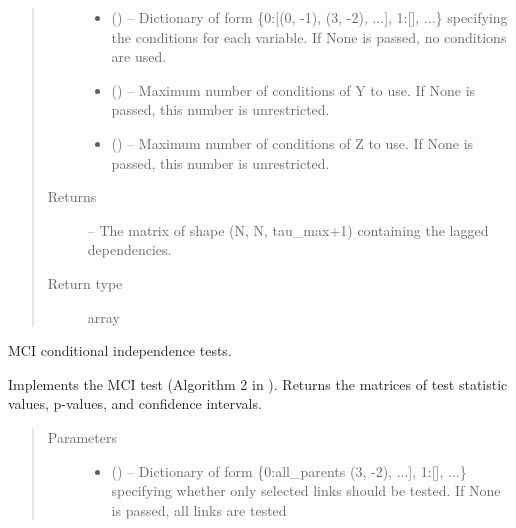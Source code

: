\documentclass[letterpaper,10pt,english]{sphinxmanual}
\begin{document}
\begin{fulllineitems}
\begin{fulllineitems}
\begin{quote}
\begin{description}
\begin{itemize}
\item {} 
 () -- Dictionary of form \{0:{[}(0, -1), (3, -2), ...{]}, 1:{[}{]}, ...\}
specifying the conditions for each variable. If None is
passed, no conditions are used.

\item {} 
 () -- Maximum number of conditions of Y to use. If None is passed, this
number is unrestricted.

\item {} 
 () -- Maximum number of conditions of Z to use. If None is passed, this
number is unrestricted.

\end{itemize}

\item[{Returns}] \leavevmode
{} -- The matrix of shape (N, N, tau\_max+1) containing the lagged
dependencies.

\item[{Return type}] \leavevmode
array

\end{description}\end{quote}

\end{fulllineitems}


\begin{fulllineitems}
\label{\detokenize{index:tigramite.pcmci.PCMCI.run_mci}}
MCI conditional independence tests.

Implements the MCI test (Algorithm 2 in \sphinxfootnotemark[1]). Returns the matrices of
test statistic values,  p-values, and confidence intervals.
\begin{quote}\begin{description}
\item[{Parameters}] \leavevmode\begin{itemize}
\item {} 
 () -- Dictionary of form \{0:all\_parents (3, -2), ...{]}, 1:{[}{]}, ...\}
specifying whether only selected links should be tested. If None is
passed, all links are tested


\end{itemize}
\end{description}
\end{quote}
\end{fulllineitems}
\end{fulllineitems}
\end{document}
